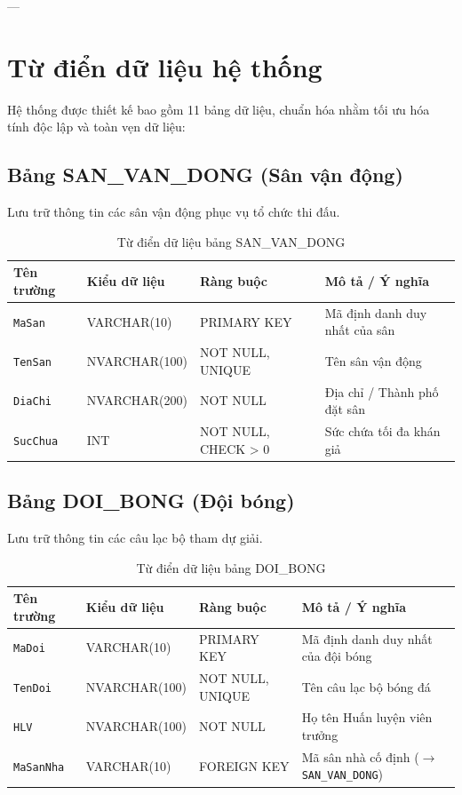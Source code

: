 ---

\section{Từ điển dữ liệu hệ thống}
Hệ thống được thiết kế bao gồm 11 bảng dữ liệu, chuẩn hóa nhằm tối ưu hóa tính độc lập và toàn vẹn dữ liệu:

\subsection{Bảng SAN\_VAN\_DONG (Sân vận động)}
Lưu trữ thông tin các sân vận động phục vụ tổ chức thi đấu.
\begin{table}[H]
\centering
\small
\begin{tabular}{|l|l|l|p{6cm}|}
\hline
\textbf{Tên trường} & \textbf{Kiểu dữ liệu} & \textbf{Ràng buộc} & \textbf{Mô tả / Ý nghĩa} \\ \hline
\texttt{MaSan} & VARCHAR(10) & PRIMARY KEY & Mã định danh duy nhất của sân \\ \hline
\texttt{TenSan} & NVARCHAR(100) & NOT NULL, UNIQUE & Tên sân vận động \\ \hline
\texttt{DiaChi} & NVARCHAR(200) & NOT NULL & Địa chỉ / Thành phố đặt sân \\ \hline
\texttt{SucChua} & INT & NOT NULL, CHECK > 0 & Sức chứa tối đa khán giả \\ \hline
\end{tabular}
\caption{Từ điển dữ liệu bảng SAN\_VAN\_DONG}
\end{table}

\subsection{Bảng DOI\_BONG (Đội bóng)}
Lưu trữ thông tin các câu lạc bộ tham dự giải.
\begin{table}[H]
\centering
\small
\begin{tabular}{|l|l|l|p{6cm}|}
\hline
\textbf{Tên trường} & \textbf{Kiểu dữ liệu} & \textbf{Ràng buộc} & \textbf{Mô tả / Ý nghĩa} \\ \hline
\texttt{MaDoi} & VARCHAR(10) & PRIMARY KEY & Mã định danh duy nhất của đội bóng \\ \hline
\texttt{TenDoi} & NVARCHAR(100) & NOT NULL, UNIQUE & Tên câu lạc bộ bóng đá \\ \hline
\texttt{HLV} & NVARCHAR(100) & NOT NULL & Họ tên Huấn luyện viên trưởng \\ \hline
\texttt{MaSanNha} & VARCHAR(10) & FOREIGN KEY & Mã sân nhà cố định ($\rightarrow$ \texttt{SAN\_VAN\_DONG}) \\ \hline
\end{tabular}
\caption{Từ điển dữ liệu bảng DOI\_BONG}
\end{table}

